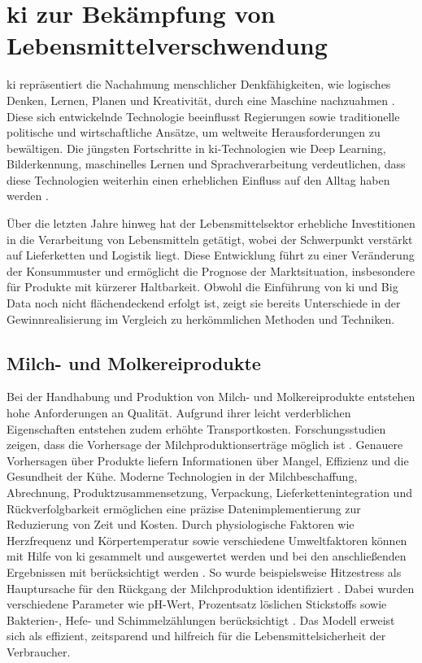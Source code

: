\section{\acs{ki} zur Bekämpfung von Lebensmittelverschwendung}
\acf{ki} repräsentiert die Nachahmung menschlicher Denkfähigkeiten, wie logisches Denken, Lernen, Planen und Kreativität, durch eine Maschine nachzuahmen \cite{EuropaischesParlament.2020}. Diese sich entwickelnde Technologie beeinflusst Regierungen sowie traditionelle politische und wirtschaftliche Ansätze, um weltweite Herausforderungen zu bewältigen. Die jüngsten Fortschritte in \ac{ki}-Technologien wie Deep Learning, Bilderkennung, maschinelles Lernen und Sprachverarbeitung verdeutlichen, dass diese Technologien weiterhin einen erheblichen Einfluss auf den Alltag haben werden \cite{Sharma.2021}.

Über die letzten Jahre hinweg hat der Lebensmittelsektor erhebliche Investitionen in die Verarbeitung von Lebensmitteln getätigt, wobei der Schwerpunkt verstärkt auf Lieferketten und Logistik liegt. Diese Entwicklung führt zu einer Veränderung der Konsummuster und ermöglicht die Prognose der Marktsituation, insbesondere für Produkte mit kürzerer Haltbarkeit. Obwohl die Einführung von \ac{ki} und Big Data noch nicht flächendeckend erfolgt ist, zeigt sie bereits Unterschiede in der Gewinnrealisierung im Vergleich zu herkömmlichen Methoden und Techniken.

\subsection{Milch- und Molkereiprodukte}
Bei der Handhabung und Produktion von Milch- und Molkereiprodukte entstehen hohe Anforderungen an Qualität. Aufgrund ihrer leicht verderblichen Eigenschaften entstehen zudem erhöhte Transportkosten. Forschungsstudien zeigen, dass die Vorhersage der Milchproduktionserträge möglich ist \cite{Ho.2015}. Genauere Vorhersagen über Produkte liefern Informationen über Mangel, Effizienz und die Gesundheit der Kühe. Moderne Technologien in der Milchbeschaffung, Abrechnung, Produktzusammensetzung, Verpackung, Lieferkettenintegration und Rückverfolgbarkeit ermöglichen eine präzise Datenimplementierung zur Reduzierung von Zeit und Kosten. Durch physiologische Faktoren wie Herzfrequenz und Körpertemperatur sowie verschiedene Umweltfaktoren können mit Hilfe von \acs{ki} gesammelt und ausgewertet werden und bei den anschließenden Ergebnissen mit berücksichtigt werden . So wurde beispielsweise Hitzestress als Hauptursache für den Rückgang der Milchproduktion identifiziert \cite{Sugiono.2017}. Dabei wurden verschiedene Parameter wie pH-Wert, Prozentsatz löslichen Stickstoffs sowie Bakterien-, Hefe- und Schimmelzählungen berücksichtigt \cite{Goyal.2013}. Das Modell erweist sich als effizient, zeitsparend und hilfreich für die Lebensmittelsicherheit der Verbraucher.

